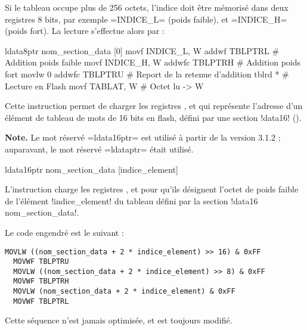 Si le tableau occupe plus de 256 octets, l'indice doit être mémorisé dans deux registres 8 bits, par exemple \pic=INDICE_L= (poids faible), et \pic=INDICE_H= (poids fort). La lecture s'effectue alors par :

\begin{piccolo}
  ldata8ptr nom_section_data [0]
  movf INDICE_L, W
  addwf TBLPTRL    # Addition poids faible
  movf INDICE_H, W
  addwfc TBLPTRH   # Addition poids fort
  movlw 0
  addwfc TBLPTRU   # Report de la retenue d'addition
  tblrd *          # Lecture en Flash 
  movf TABLAT, W   # Octet lu -> W
\end{piccolo}




Cette instruction permet de charger les registres ,  et  qui représente l'adresse d'un élément de tableau de mots de 16 bits en flash, défini par une section \pic!data16! ().


{\bf Note.} Le mot réservé \pic=ldata16ptr= est utilisé à partir de la version 3.1.2 ; auparavant, le mot réservé \pic=ldataptr= était utilisé.

\begin{piccolo}
  ldata16ptr nom_section_data [indice_element]
\end{piccolo}

L'instruction charge les registres ,  et  pour qu'ils désignent l'octet de poids faible de l'élément \pic!indice_element! du tableau défini par la section \pic!data16 nom_section_data!.

Le code engendré est le suivant :
\begin{lstlisting}[language=assembleur]
  MOVLW ((nom_section_data + 2 * indice_element) >> 16) & 0xFF
  MOVWF TBLPTRU
  MOVLW ((nom_section_data + 2 * indice_element) >> 8) & 0xFF
  MOVWF TBLPTRH
  MOVLW (nom_section_data + 2 * indice_element) & 0xFF
  MOVWF TBLPTRL
\end{lstlisting}

Cette séquence n'est jamais optimisée, et  est toujours modifié.




